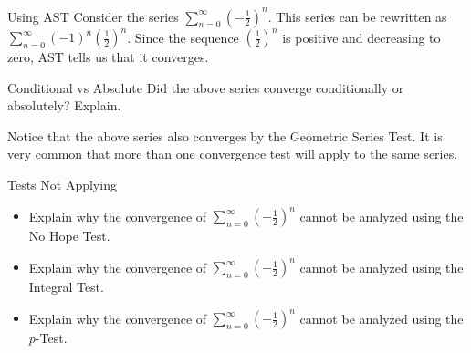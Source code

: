\begin{example}{Using AST}
Consider the series $\sum_{n=0}^{\infty} \left(-\frac{1}{2}\right)^n$.  This series can be rewritten as $\sum_{n=0}^{\infty} \left(-1\right)^n\left(\frac{1}{2}\right)^n$.  Since the sequence $\left(\frac{1}{2}\right)^n$ is positive and decreasing to zero, AST tells us that it converges. 
\end{example}
\begin{exercise}{Conditional vs Absolute \Coffeecup}
Did the above series converge conditionally or absolutely?  Explain. \vspace*{.3in}
\end{exercise}
Notice that the above series also converges by the Geometric Series Test.  It is very common that more than one convergence test will apply to the same series.
\begin{exercise}{Tests Not Applying \Coffeecup}

\begin{itemize}
\item Explain why the convergence of $\sum_{n=0}^{\infty} \left(-\frac{1}{2}\right)^n$ cannot be analyzed using the No Hope Test. 
\vspace*{.5in}
\item Explain why the convergence of $\sum_{n=0}^{\infty} \left(-\frac{1}{2}\right)^n$ cannot be analyzed using the Integral Test. 
\vspace*{.5in}
\item Explain why the convergence of $\sum_{n=0}^{\infty} \left(-\frac{1}{2}\right)^n$ cannot be analyzed using the $p$-Test.
\vspace*{.5in}
\end{itemize}

\end{exercise}
